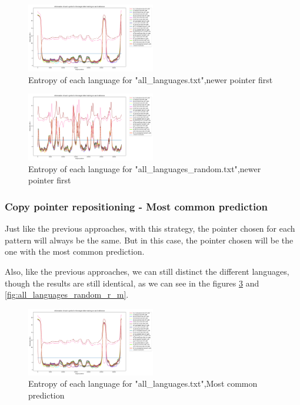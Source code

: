 \documentclass{article}
\begin{document}
\begin{figure}
    \centering
    \includegraphics[width=0.5\textwidth]{../results/all_languages/-r_n.png}
    \caption{Entropy of each language for "all_languages.txt",newer pointer first}
    \label{fig:all_languages_r_n}
\end{figure}

\begin{figure}
    \centering
    \includegraphics[width=0.5\textwidth]{../results/all_languages_random/-r_n.png}
    \caption{Entropy of each language for "all_languages_random.txt",newer pointer first}
    \label{fig:all_languages_random_r_n}
\end{figure}

\subsubsection{Copy pointer repositioning - Most common prediction}
\label{subsubsec:results_locate_lang_most_common_prediction}

Just like the previous approaches, with this strategy, the pointer chosen for each pattern will always be the same.
But in this case, the pointer chosen will be the one with the most common prediction.

Also, like the previous approaches, we can still distinct the different languages, though the results are still identical, as we can see in the figures \ref{fig:all_languages_r_m} and \ref{fig:all_languages_random_r_m}.

\begin{figure}
    \centering
    \includegraphics[width=0.5\textwidth]{../results/all_languages/-r_m.png}
    \caption{Entropy of each language for "all_languages.txt",Most common prediction}
    \label{fig:all_languages_r_m}
\end{figure}
\end{document}
